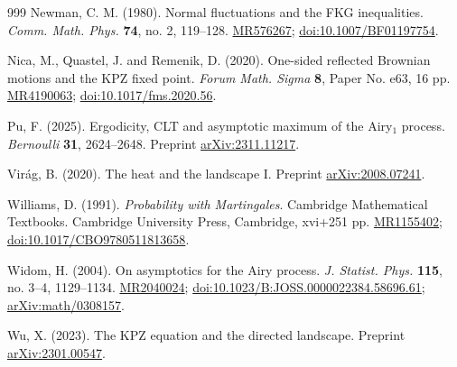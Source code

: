 \documentclass[12pt, reqno]{amsart}
\numberwithin{equation}{section}
\theoremstyle{definition}
\begin{document}
\begin{thebibliography}{999}
Newman, C. M. (1980).
Normal fluctuations and the FKG inequalities.
\textit{Comm. Math. Phys.} \textbf{74}, no. 2, 119--128.
\href{https://mathscinet.ams.org/mathscinet-getitem?mr=576267}{MR576267};
\href{https://doi.org/10.1007/BF01197754}{doi:10.1007/BF01197754}.

Nica, M., Quastel, J. and Remenik, D. (2020).
One-sided reflected Brownian motions and the KPZ fixed point.
\textit{Forum Math. Sigma} \textbf{8}, Paper No. e63, 16 pp.
\href{https://mathscinet.ams.org/mathscinet-getitem?mr=4190063}{MR4190063};
\href{https://doi.org/10.1017/fms.2020.56}{doi:10.1017/fms.2020.56}.

Pu, F. (2025).
Ergodicity, CLT and asymptotic maximum of the Airy$_1$ process.
\textit{Bernoulli} \textbf{31}, 2624--2648.
Preprint \href{https://arxiv.org/abs/2311.11217}{arXiv:2311.11217}.

Vir\'ag, B. (2020).
The heat and the landscape I.
Preprint \href{https://arxiv.org/abs/2008.07241}{arXiv:2008.07241}.

Williams, D. (1991).
\textit{Probability with Martingales}.
Cambridge Mathematical Textbooks. Cambridge University Press, Cambridge, xvi+251 pp.
\href{https://mathscinet.ams.org/mathscinet-getitem?mr=1155402}{MR1155402};
\href{https://doi.org/10.1017/CBO9780511813658}{doi:10.1017/CBO9780511813658}.

Widom, H. (2004).
On asymptotics for the Airy process.
\textit{J. Statist. Phys.} \textbf{115}, no. 3--4, 1129--1134.
\href{https://mathscinet.ams.org/mathscinet-getitem?mr=2040024}{MR2040024};
\href{https://doi.org/10.1023/B:JOSS.0000022384.58696.61}{doi:10.1023/B:JOSS.0000022384.58696.61};
\href{https://arxiv.org/abs/math/0308157}{arXiv:math/0308157}.

Wu, X. (2023).
The KPZ equation and the directed landscape.
Preprint \href{https://arxiv.org/abs/2301.00547}{arXiv:2301.00547}.

\end{thebibliography}
\end{document}
